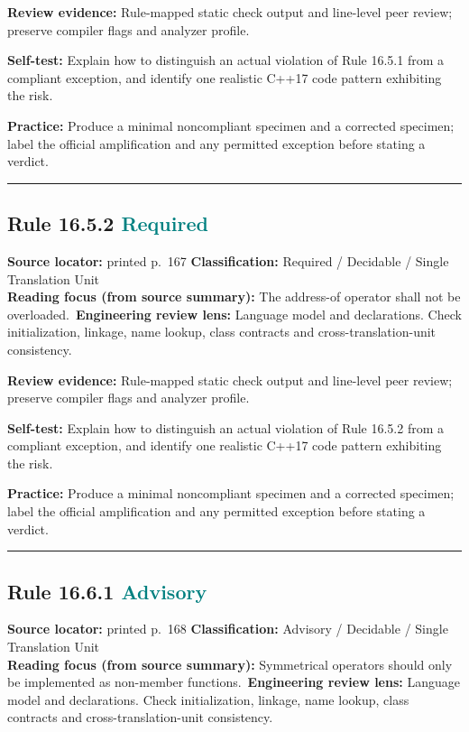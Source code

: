 \documentclass[10pt,letterpaper]{article}
\begin{document}
\textbf{Review evidence:} Rule-mapped static check output and line-level peer review; preserve compiler flags and analyzer profile.

\textbf{Self-test:} Explain how to distinguish an actual violation of Rule 16.5.1 from a compliant exception, and identify one realistic C++17 code pattern exhibiting the risk.\par
\textbf{Practice:} Produce a minimal noncompliant specimen and a corrected specimen; label the official amplification and any permitted exception before stating a verdict.
\smallskip\hrule\smallskip
\subsection*{Rule 16.5.2 \enspace \texorpdfstring{\small\textcolor{teal}{Required}}{Required}}
\noindent\textbf{Source locator:} printed p.~167 \quad\textbf{Classification:} Required / Decidable / Single Translation Unit\\
\textbf{Reading focus (from source summary):} The address-of operator shall not be overloaded.\
\textbf{Engineering review lens:} Language model and declarations. Check initialization, linkage, name lookup, class contracts and cross-translation-unit consistency.

\textbf{Review evidence:} Rule-mapped static check output and line-level peer review; preserve compiler flags and analyzer profile.

\textbf{Self-test:} Explain how to distinguish an actual violation of Rule 16.5.2 from a compliant exception, and identify one realistic C++17 code pattern exhibiting the risk.\par
\textbf{Practice:} Produce a minimal noncompliant specimen and a corrected specimen; label the official amplification and any permitted exception before stating a verdict.
\smallskip\hrule\smallskip
\subsection*{Rule 16.6.1 \enspace \texorpdfstring{\small\textcolor{teal}{Advisory}}{Advisory}}
\noindent\textbf{Source locator:} printed p.~168 \quad\textbf{Classification:} Advisory / Decidable / Single Translation Unit\\
\textbf{Reading focus (from source summary):} Symmetrical operators should only be implemented as non-member functions.\
\textbf{Engineering review lens:} Language model and declarations. Check initialization, linkage, name lookup, class contracts and cross-translation-unit consistency.
\end{document}
